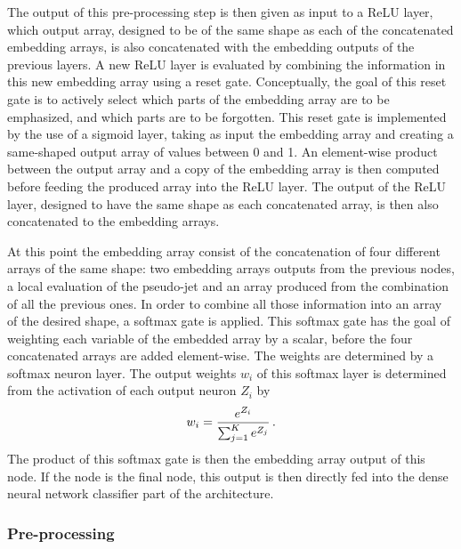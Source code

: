 The output of this pre-processing step is then given as input to a ReLU layer, which output array, designed to be of the same shape as each of the concatenated embedding arrays, is also concatenated with the embedding outputs of the previous layers. A new ReLU layer is evaluated by combining the information in this new embedding array using a reset gate. Conceptually, the goal of this reset gate is to actively select which parts of the embedding array are to be emphasized, and which parts are to be forgotten. This reset gate is implemented by the use of a sigmoid layer, taking as input the embedding array and creating a same-shaped output array of values between 0 and 1. An element-wise product between the output array and a copy of the embedding array is then computed before feeding the produced array into the ReLU layer. The output of the ReLU layer, designed to have the same shape as each concatenated array, is then also concatenated to the embedding arrays.

At this point the embedding array consist of the concatenation of four different arrays of the same shape: two embedding arrays outputs from the previous nodes, a local evaluation of the pseudo-jet and an array produced from the combination of all the previous ones. In order to combine all those information into an array of the desired shape, a softmax gate is applied. This softmax gate has the goal of weighting each variable of the embedded array by a scalar, before the four concatenated arrays are added element-wise. The weights are determined by a softmax neuron layer. The output weights $w_i$ of this softmax layer is determined from the activation of each output neuron $Z_i$ by
\begin{equation}
    w_{i} = \frac{e^{Z_i}}{\sum_{j=1}^{K}e^{Z_j}} \mend
\end{equation}
The product of this softmax gate is then the embedding array output of this node. If the node is the final node, this output is then directly fed into the dense neural network classifier part of the architecture.

\subsubsection{Pre-processing}

